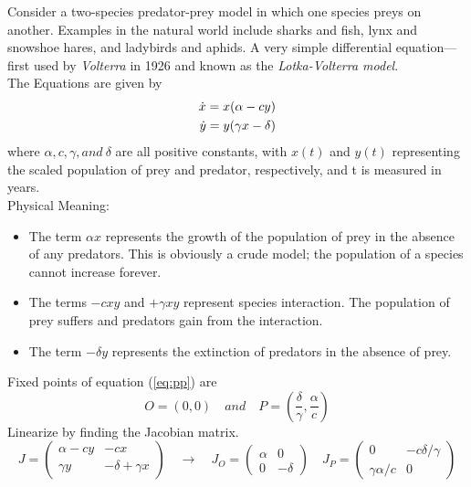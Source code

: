 Consider a two-species predator-prey model in which one species preys on another.
Examples in the natural world include sharks and fish, lynx and snowshoe hares, and ladybirds and aphids.
A very simple differential equation—first used by \emph{Volterra} in 1926 and known as the \emph{Lotka-Volterra model}.\\
The Equations are given by
\begin{equation}{\label{eq:pp}}
	\begin{aligned}
		\dot{x}=x(\alpha-cy)\\
		\dot{y}=y(\gamma x-\delta)
	\end{aligned}
\end{equation}
where $\alpha, c, \gamma, and\ \delta$ are all positive constants, with $x(t)$ and $y(t)$ representing the scaled population of prey and predator, respectively, and t is measured in years.\\
Physical Meaning:
\begin{itemize}
	\item The term $\alpha x$ represents the growth of the population of prey in the absence of any predators. This is obviously a crude model; the population of a species cannot increase forever.
	\item The terms $-cxy$ and $+\gamma xy$ represent species interaction. The population of prey suffers and predators gain from the interaction.
	\item The term $-\delta y$ represents the extinction of predators in the absence of prey.
\end{itemize}
Fixed points of equation (\ref{eq:pp}) are
\begin{equation}
	O=(0,0) \quad and \quad P=\left(\frac{\delta}{\gamma},\frac{\alpha}{c}\right)
\end{equation}
Linearize by finding the Jacobian matrix.
\begin{equation}
	J=
	\begin{pmatrix}
		\alpha-cy&-cx\\\gamma y&-\delta+\gamma x
	\end{pmatrix}\quad\rightarrow\quad
	J_O=
	\begin{pmatrix}
		\alpha&0\\
		0&-\delta
	\end{pmatrix}\quad
	J_P=
	\begin{pmatrix}
		0&-c\delta/\gamma\\
		\gamma\alpha/c&0
	\end{pmatrix}
\end{equation}
